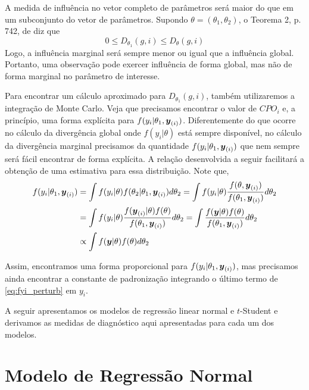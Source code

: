 A medida de influência no vetor completo de parâmetros será maior do que em um subconjunto do vetor de parâmetros. Supondo $\theta=(\theta_1,\theta_2)$, o Teorema 2, p. 742, de \citet{Weiss1996} diz que
\begin{equation}
0\leqslant D_{\theta_1}(g,i)\leqslant D_\theta(g,i)
\end{equation}
Logo, a influência marginal será sempre menor ou igual que a influência global. Portanto, uma observação pode exercer influência de forma global, mas não de forma marginal no parâmetro de interesse.

Para encontrar um cálculo aproximado para $D_{\theta_1}(g,i)$, também utilizaremos a integração de Monte Carlo. Veja que precisamos encontrar o valor de $CPO_i$ e, a princípio, uma forma explícita para $f(y_i|\theta_1,{\boldsymbol{y}_{(i)}})$. Diferentemente do que ocorre no cálculo da divergência global onde $f(y_i|\theta)$ está sempre disponível, no cálculo da divergência marginal precisamos da quantidade $f(y_i|\theta_1,{\boldsymbol{y}_{(i)}})$ que nem sempre será fácil encontrar de forma explícita. A relação desenvolvida a seguir facilitará a obtenção de uma estimativa para essa distribuição. Note que,
\begin{equation}\label{eq:fyi_perturb}
\begin{split}
f(y_i|\theta_1,{\boldsymbol{y}_{(i)}}) & = \int f(y_i|\theta)f(\theta_2|\theta_1, {\boldsymbol{y}_{(i)}}) d \theta_2 = \int f(y_i|\theta)\frac{f(\theta,{\boldsymbol{y}_{(i)}})}{f(\theta_1,{\boldsymbol{y}_{(i)}})}d\theta_2 \\
{} & = \int f(y_i|\theta)\frac{f({\boldsymbol{y}_{(i)}}|\theta)f(\theta)}{f(\theta_1,{\boldsymbol{y}_{(i)}})}d\theta_2 = \int \frac{f({\boldsymbol{y}}|\theta)f(\theta)}{f(\theta_1,{\boldsymbol{y}_{(i)}})}d\theta_2 \\
{} & \propto \int f({\boldsymbol{y}}|\theta)f(\theta)d\theta_2
\end{split}
\end{equation}

Assim, encontramos uma forma proporcional para $f(y_i|\theta_1,{\boldsymbol{y}_{(i)}})$, mas precisamos ainda encontrar a constante de padronização integrando o último termo de \eqref{eq:fyi_perturb} em $y_i$.

A seguir apresentamos os modelos de regressão linear normal e $t$-Student e derivamos as medidas de diagnóstico aqui apresentadas para cada um dos modelos.


\section{Modelo de Regressão Normal}
\label{sec:reg_Normal}

